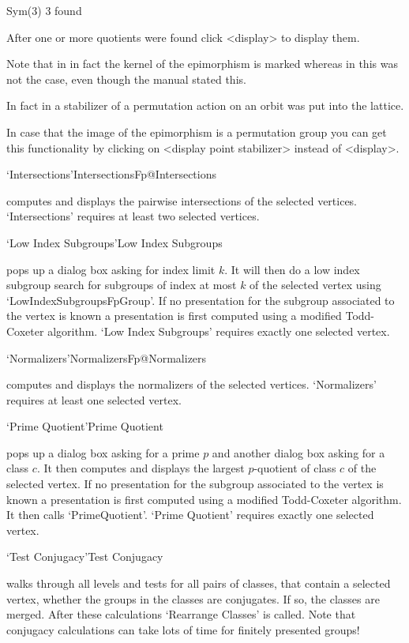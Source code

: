 \begintt
Sym(3)        3 found
\endtt

After one or more quotients were found click <display> to display them.

Note that in {} in fact the kernel of the epimorphism is marked whereas 
in {} this was not the case, even though the {} manual stated
this.  

In fact in {} a stabilizer of a permutation action on an orbit was
put into the lattice.

In case that the image of the epimorphism is a permutation group you can
get this functionality by clicking on <display point stabilizer> instead of 
<display>. 

\>`Intersections'{IntersectionsFp}@{Intersections}

computes and   displays   the pairwise   intersections  of  the  selected
vertices.  `Intersections' requires at least two selected vertices.

\>`Low Index Subgroups'{Low Index Subgroups}

pops up a dialog box asking for index  limit $k$.  It  will then do a low
index subgroup search for  subgroups of index at  most $k$ of the selected
vertex using `LowIndexSubgroupsFpGroup'.    If no  presentation  for  the
subgroup   associated to  the vertex  is  known a  presentation  is first
computed using a  modified  Todd-Coxeter algorithm. `Low Index Subgroups'
requires  exactly one selected vertex.

\>`Normalizers'{NormalizersFp}@{Normalizers}

computes and displays the normalizers of the selected vertices.
`Normalizers' requires at least one selected vertex.

\>`Prime Quotient'{Prime Quotient}

pops up a dialog box asking for a prime $p$ and another dialog box asking
for a class $c$.  It then  computes and displays the largest $p$-quotient
of class $c$ of the selected vertex.  If no presentation for the subgroup
associated to the vertex is known a  presentation is first computed using
a   modified  Todd-Coxeter algorithm.   It    then calls `PrimeQuotient'.
`Prime Quotient' requires exactly one selected vertex.

\>`Test Conjugacy'{Test Conjugacy}

walks through all levels and tests for all pairs of classes, that contain a 
selected vertex, whether the groups in the classes are conjugates. If so,
the classes are merged. After these calculations `Rearrange Classes' is
called. Note that conjugacy calculations can take lots of time for finitely 
presented groups!

